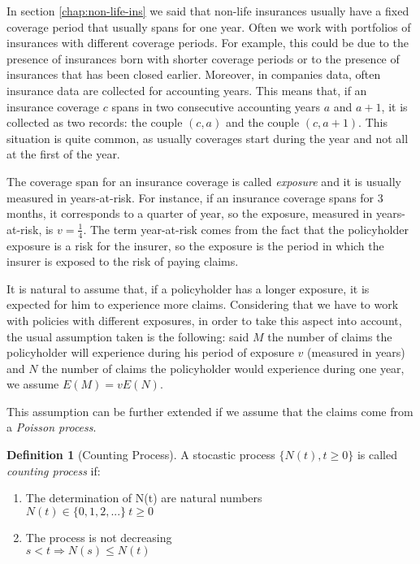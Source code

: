 \documentclass[a4paper, twoside, openright, 12pt]{report}
\theoremstyle{definition}
\newtheorem{definition}{Definition}[chapter]
\theoremstyle{definition}
\theoremstyle{definition}
\theoremstyle{remark}
\begin{document}
In section \ref{chap:non-life-ins} we said that non-life insurances usually have a fixed coverage period that usually spans for one year. Often we work with portfolios of insurances with different coverage periods. For example, this could be due to the presence of insurances born with shorter coverage periods or to the presence of insurances that has been closed earlier. Moreover, in companies data, often insurance data are collected for accounting years. This means that, if an insurance coverage \(c\) spans in two consecutive accounting years \(a\) and \(a+1\), it is collected as two records: the couple \((c, a)\) and the couple \((c, a+1)\). This situation is quite common, as usually coverages start during the year and not all at the first of the year.

The coverage span for an insurance coverage is called \emph{exposure} and it is usually measured in years-at-risk. For instance, if an insurance coverage spans for 3 months, it corresponds to a quarter of year, so the exposure, measured in years-at-risk, is \(v=\frac{1}{4}\). The term year-at-risk comes from the fact that the policyholder exposure is a risk for the insurer, so the exposure is the period in which the insurer is exposed to the risk of paying claims.

It is natural to assume that, if a policyholder has a longer exposure, it is expected for him to experience more claims. Considering that we have to work with policies with different exposures, in order to take this aspect into account, the usual assumption taken is the following: said \(M\) the number of claims the policyholder will experience during his period of exposure \(v\) (measured in years) and \(N\) the number of claims the policyholder would experience during one year, we assume \(E(M) = v E(N)\).

This assumption can be further extended if we assume that the claims come from a \emph{Poisson process}.

\begin{definition}[Counting Process]
\label{def:def-process-count} \iffalse (Counting Process) \fi{} A stocastic process \(\{N(t), t\ge0\}\) is called \textit{counting process} if:

\begin{enumerate}
\item The determination of N(t) are natural numbers \\
      $N(t) \in \{ 0, 1, 2, ... \} \ t\ge 0$
\item The process is not decreasing \\
      $s < t \Rightarrow N(s) \le N(t)$
\end{enumerate}
\end{definition}
\end{document}
